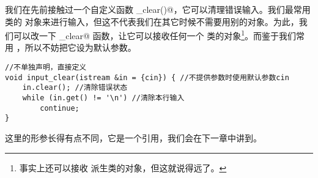 我们在先前接触过一个自定义函数 \lstinline@input_clear()@，它可以清理错误输入。我们最常用 \lstinline@istream@ 类的 \lstinline@cin@ 对象来进行输入，但这不代表我们在其它时候不需要用别的对象。为此，我们可以改一下 \lstinline@input_clear@ 函数，让它可以接收任何一个 \lstinline@istream@ 类的对象\footnote{事实上还可以接收 \lstinline@istream@ 派生类的对象，但这就说得远了。}。而鉴于我们常用 \lstinline@cin@，所以不妨把它设为默认参数。\par
\begin{lstlisting}
//不单独声明，直接定义
void input_clear(istream &in = {cin}) { //不提供参数时使用默认参数cin
    in.clear(); //清除错误状态
    while (in.get() != '\n') //清除本行输入
        continue;
}
\end{lstlisting}
这里的形参长得有点不同，它是一个引用，我们会在下一章中讲到。\par
